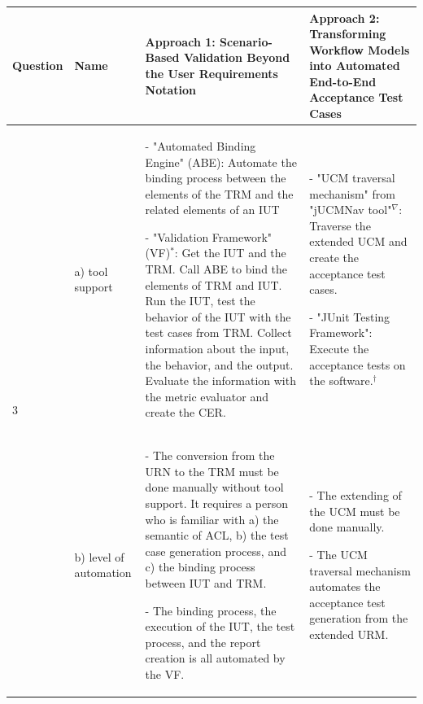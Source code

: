 \newpage
{}
\begin{landscape}
	\begin{table}
		\caption{Synthesis Matrix part 2/2.}
		\begin{longtable}[h]{|p{1.3cm}|>{\raggedright}p{2.6cm}|>{}p{9.2cm}|>{}p{9.2cm}|}
			\hline
			Question 
			& Name 
			& Approach 1: \textbf{Scenario-Based Validation Beyond the User Requirements Notation} 
			& Approach 2: \textbf{Transforming Workflow Models into Automated End-to-End Acceptance Test Cases}\\ \hline
			\multirow{2}{*}{3 \rotatebox[origin=r]{90}{\textbf{Tools}}} 
			& a) tool support 
			& - "Automated Binding Engine" (ABE): Automate the binding process between the elements of the TRM and the related elements of an IUT
			
			- "Validation Framework" (VF)$^*$: Get the IUT and the TRM. Call ABE to bind the elements of TRM and IUT. Run the IUT, test the behavior of the IUT with the test cases from TRM. Collect information about the input, the behavior, and the output. Evaluate the information with the metric evaluator and create the CER.
			& 		
			- "UCM traversal mechanism" from "jUCMNav tool"$^\nabla$: Traverse the extended UCM and create the acceptance test cases.
			
			- "JUnit Testing Framework": Execute the acceptance tests on the software.$^\dagger$\\ 
			\cline{2-4}
			& b) level of automation 
			& - The conversion from the URN to the TRM must be done manually without tool support. It requires a person who is familiar with a) the semantic of ACL, b) the test case generation process, and c) the binding process between IUT and TRM.  
			
			- The binding process, the execution of the IUT, the test process, and the report creation is all automated by the VF.
			& 
			- The extending of the UCM must be done manually.
			
			- The UCM traversal mechanism automates the acceptance test generation from the extended URM.
			

\end{longtable}
\end{table}
\end{landscape}
